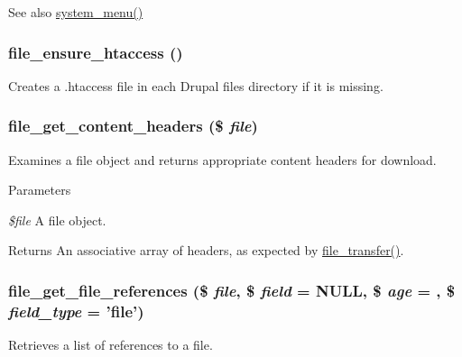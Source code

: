 \begin{DoxySeeAlso}{See also}
\hyperlink{system_8module_ae25cda0ea4fd63936e8f955dd9cfc269}{system\_\-menu()} 
\end{DoxySeeAlso}
\hypertarget{group__file_gabb0ecbecf4cff451bd30a4bbc3e2d57f}{
\subsubsection[{file\_\-ensure\_\-htaccess}]{\setlength{\rightskip}{0pt plus 5cm}file\_\-ensure\_\-htaccess ()}}
\label{group__file_gabb0ecbecf4cff451bd30a4bbc3e2d57f}
Creates a .htaccess file in each Drupal files directory if it is missing. \hypertarget{group__file_ga33aed1fe449367d57b8f9a774a449f27}{
\subsubsection[{file\_\-get\_\-content\_\-headers}]{\setlength{\rightskip}{0pt plus 5cm}file\_\-get\_\-content\_\-headers (\$ {\em file})}}
\label{group__file_ga33aed1fe449367d57b8f9a774a449f27}
Examines a file object and returns appropriate content headers for download.


\begin{DoxyParams}{Parameters}
\item[{\em \$file}]A file object.\end{DoxyParams}
\begin{DoxyReturn}{Returns}
An associative array of headers, as expected by \hyperlink{group__file_ga7b047ab67ab5bb3882d573d7e06ab485}{file\_\-transfer()}. 
\end{DoxyReturn}
\hypertarget{group__file_gad391f02fb9f97bad982b7f66c1ce54d0}{
\subsubsection[{file\_\-get\_\-file\_\-references}]{\setlength{\rightskip}{0pt plus 5cm}file\_\-get\_\-file\_\-references (\$ {\em file}, \/  \$ {\em field} = {\ttfamily NULL}, \/  \$ {\em age} = {}, \/  \$ {\em field\_\-type} = {\ttfamily 'file'})}}
\label{group__file_gad391f02fb9f97bad982b7f66c1ce54d0}
Retrieves a list of references to a file.


